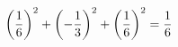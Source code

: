 \documentclass[preview]{standalone}
\begin{document}
\begin{align*}
\special{dvisvgm:raw <g id='unique000'>}\left(\dfrac{1}{6}\right)^2+\left(-\dfrac{1}{3}\right)^2+\left(\dfrac{1}{6}\right)^2=\dfrac{1}{6}\special{dvisvgm:raw </g>}
\end{align*}
\end{document}
